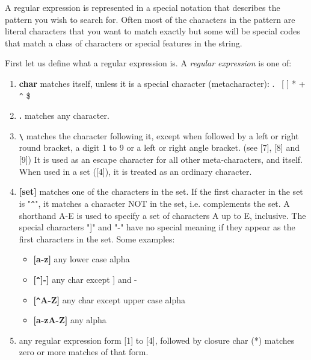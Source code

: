 A regular expression is represented in a special notation that
describes the pattern you wish to search for.
Often most of the characters in the pattern are literal characters that
you want to match exactly but some will be special codes that match
a class of characters or special features in the string.

First let us define what a regular expression is.
A {\it regular expression} is one of:

\begin{enumerate}

\item {\bf char} matches itself, unless it is a special
                character (metacharacter): . \ [ ] * + \verb+^+ \$

\item {\bf .} matches any character.

\item {\bf \verb+\+} matches the character following it, except
		when followed by a left or right round bracket,
		a digit 1 to 9 or a left or right angle bracket. 
		(see [7], [8] and [9])
		It is used as an escape character for all 
		other meta-characters, and itself. When used
		in a set ([4]), it is treated as an ordinary
		character.

\item {\bf [set]} matches one of the characters in the set.
                If the first character in the set is "\verb+^+",
                it matches a character NOT in the set, i.e. 
		complements the set. A shorthand A-E is 
		used to specify a set of characters A up to 
		E, inclusive. The special characters "]" and 
		"-" have no special meaning if they appear 
		as the first characters in the set.
                Some examples:
		\begin{itemize}
                \item {\bf [a-z]} any lower case alpha

                \item {\bf [\verb+^+]-]} any char except ] and -

                \item {\bf [\verb+^+A-Z]} any char except upper case alpha

                \item {\bf [a-zA-Z]} any alpha
		\end{itemize}

\item {\bf *} any regular expression form [1] to [4], followed by
                closure char (*) matches zero or more matches of
                that form.


\end{enumerate}
